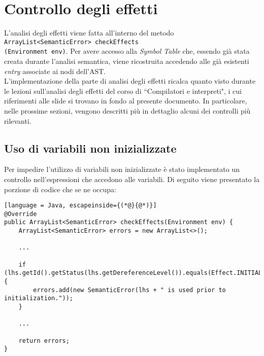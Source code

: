 \documentclass[../report.tex]{subfiles}
\begin{document}
\section{Controllo degli effetti}\label{s:controllo-effetti}
L'analisi degli effetti viene fatta all'interno del metodo \verb|ArrayList<SemanticError> checkEffects|\\\verb|(Environment env)|. Per avere accesso alla \textit{Symbol Table} che, essendo già stata creata durante l'analisi semantica, viene ricostruita accedendo alle già esistenti \textit{entry} associate ai nodi dell'AST.\\
\noindent
L'implementazione della parte di analisi degli effetti ricalca quanto visto durante le lezioni sull'analisi degli effetti del corso di ``Compilatori e interpreti", i cui riferimenti alle slide si trovano in fondo al presente documento.
In particolare, nelle prossime sezioni, vengono descritti più in dettaglio alcuni dei controlli più rilevanti.

\subsection{Uso di variabili non inizializzate}\label{s:uso-variabili-non-inizializzate}
Per impedire l'utilizzo di variabili non inizializzate è stato implementato un controllo nell'espressioni che accedono alle variabili.
Di seguito viene presentato la porzione di codice che se ne occupa:
\begin{lstlisting}[language = Java, escapeinside={(*@}{@*)}]
@Override
public ArrayList<SemanticError> checkEffects(Environment env) {
    ArrayList<SemanticError> errors = new ArrayList<>();

    ...

    if (lhs.getId().getStatus(lhs.getDereferenceLevel()).equals(Effect.INITIALIZED)) {
        errors.add(new SemanticError(lhs + " is used prior to initialization."));
    }

    ...

    return errors;
}
\end{lstlisting}
\end{document}
